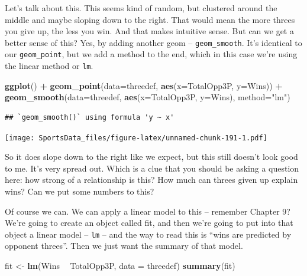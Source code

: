 \documentclass[
]{book}
\newenvironment{Shaded}{\begin{snugshade}}{\end{snugshade}}
\newcommand{\DataTypeTok}[1]{\textcolor[rgb]{0.13,0.29,0.53}{#1}}
\newcommand{\KeywordTok}[1]{\textcolor[rgb]{0.13,0.29,0.53}{\textbf{#1}}}
\newcommand{\NormalTok}[1]{#1}
\newcommand{\OperatorTok}[1]{\textcolor[rgb]{0.81,0.36,0.00}{\textbf{#1}}}
\newcommand{\StringTok}[1]{\textcolor[rgb]{0.31,0.60,0.02}{#1}}
\begin{document}
Let's talk about this. This seems kind of random, but clustered around the middle and maybe sloping down to the right. That would mean the more threes you give up, the less you win. And that makes intuitive sense. But can we get a better sense of this? Yes, by adding another geom -- \texttt{geom\_smooth}. It's identical to our \texttt{geom\_point}, but we add a method to the end, which in this case we're using the linear method or \texttt{lm}.

\begin{Shaded}
\begin{Highlighting}[]
\KeywordTok{ggplot}\NormalTok{() }\OperatorTok{+}\StringTok{ }
\StringTok{  }\KeywordTok{geom_point}\NormalTok{(}\DataTypeTok{data=}\NormalTok{threedef, }\KeywordTok{aes}\NormalTok{(}\DataTypeTok{x=}\NormalTok{TotalOpp3P, }\DataTypeTok{y=}\NormalTok{Wins)) }\OperatorTok{+}
\StringTok{  }\KeywordTok{geom_smooth}\NormalTok{(}\DataTypeTok{data=}\NormalTok{threedef, }\KeywordTok{aes}\NormalTok{(}\DataTypeTok{x=}\NormalTok{TotalOpp3P, }\DataTypeTok{y=}\NormalTok{Wins), }\DataTypeTok{method=}\StringTok{"lm"}\NormalTok{)}
\end{Highlighting}
\end{Shaded}

\begin{verbatim}
## `geom_smooth()` using formula 'y ~ x'
\end{verbatim}

\texttt{[image: SportsData\_files/figure-latex/unnamed-chunk-191-1.pdf]}

So it does slope down to the right like we expect, but this still doesn't look good to me. It's very spread out. Which is a clue that you should be asking a question here: how strong of a relationship is this? How much can threes given up explain wins? Can we put some numbers to this?

Of course we can. We can apply a linear model to this -- remember Chapter 9? We're going to create an object called fit, and then we're going to put into that object a linear model -- \texttt{lm} -- and the way to read this is ``wins are predicted by opponent threes''. Then we just want the summary of that model.

\begin{Shaded}
\begin{Highlighting}[]
\NormalTok{fit <-}\StringTok{ }\KeywordTok{lm}\NormalTok{(Wins }\OperatorTok{~}\StringTok{ }\NormalTok{TotalOpp3P, }\DataTypeTok{data =}\NormalTok{ threedef)}
\KeywordTok{summary}\NormalTok{(fit)}
\end{Highlighting}
\end{Shaded}
\end{document}
